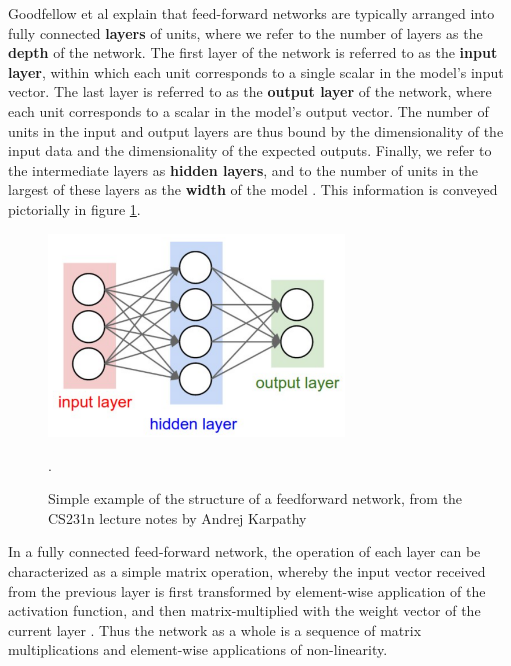 \documentclass[12pt, titlepage]{report}
\theoremstyle{definition}
\begin{document}
Goodfellow et al explain that feed-forward networks are typically arranged into fully connected \textbf{layers} of units, where we refer to the number of layers as the \textbf{depth} of the network. The first layer of the network is referred to as the \textbf{input layer}, within which each unit corresponds to a single scalar in the model's input vector. The last layer is referred to as the \textbf{output layer} of the network, where each unit corresponds to a scalar in the model's output vector. The number of units in the input and output layers are thus bound by the dimensionality of the input data and the dimensionality of the expected outputs. Finally, we refer to the intermediate layers as \textbf{hidden layers}, and to the number of units in the largest of these layers as the \textbf{width} of the model \cite[p. 164-165]{goodfellow2016deep}. This information is conveyed pictorially in figure \ref{figure:feedforward}.

\begin{figure}
\centering
\includegraphics[width=0.7\textwidth]{img/feedforward.png}\\
\caption{Simple example of the structure of a feedforward network, from the CS231n lecture notes by Andrej Karpathy \cite[Neural Networks Part 1 : Setting up the Architecture]{karpathy2017cs231n}}.
\label{figure:feedforward}
\end{figure}

In a fully connected feed-forward network, the operation of each layer can be characterized as a simple matrix operation, whereby the input vector received from the previous layer is first transformed by element-wise application of the activation function, and then matrix-multiplied with the weight vector of the current layer \cite[p. 170-171]{goodfellow2016deep}. Thus the network as a whole is a sequence of matrix multiplications and element-wise applications of non-linearity.
\end{document}
